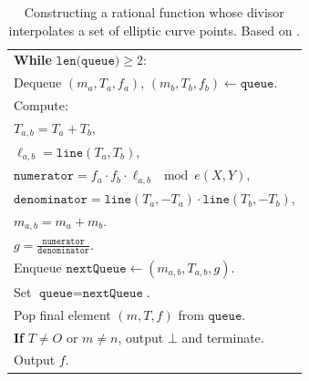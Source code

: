 \documentclass[11pt,letterpaper]{article}
\theoremstyle{definition}
\newcommand{\6}{\mathbf}
\newcommand{\7}{\mathcal}
\begin{document}
\begin{table}[H]
\begin{tabular}{|l|}
        \quad \textbf{While} $\texttt{len(queue)} \geq 2$:\\
        \quad\quad Dequeue $(m_a, T_a, f_a)$, $(m_b, T_b, f_b) \leftarrow \texttt{queue}$.\\
        \quad\quad Compute:\\
        \quad\quad\quad $T_{a,b} = T_a + T_b$,\\
        \quad\quad\quad $\ell_{a,b} = \texttt{line}(T_a,T_b)$,\\
        \quad\quad\quad $\texttt{numerator} = f_a \cdot f_b \cdot \ell_{a,b}\mod e(X,Y)$,\\
        \quad\quad\quad $\texttt{denominator} = \texttt{line}(T_a,-T_a)\cdot\texttt{line}(T_b,-T_b)$,\\

        \quad \quad\quad $m_{a,b} = m_a + m_b$.\\
        \quad\quad\quad $g = \frac{\texttt{numerator}}{\texttt{denominator}}$. \\

        \quad\quad Enqueue $\texttt{nextQueue} \leftarrow (m_{a,b}, T_{a,b}, g)$.\\

        \quad Set $\texttt{queue} = \texttt{nextQueue}$.\\
    Pop final element $(m, T, f)$ from $\texttt{queue}$.\\
    \textbf{If} $T \neq O$ or $m \neq n$, output $\bot$ and terminate.\\
    Output $f$. \\

    \hline
    \end{tabular}    
    \caption{
        Constructing a rational function whose divisor interpolates a set of elliptic curve points. Based on \cite{Kayaba}.
    }
    \label{alg:makewitness}
\end{table}
\end{document}
